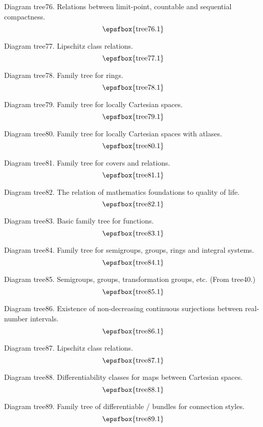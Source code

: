 \filleject

Diagram tree76. Relations between limit-point, countable and sequential
compactness.
$$
\centerline{\epsfbox{tree76.1}}
$$

Diagram tree77. Lipschitz class relations.
$$
\centerline{\epsfbox{tree77.1}}
$$

Diagram tree78. Family tree for rings.
$$
\centerline{\epsfbox{tree78.1}}
$$

\filleject

Diagram tree79. Family tree for locally Cartesian spaces.
$$
\centerline{\epsfbox{tree79.1}}
$$

Diagram tree80. Family tree for locally Cartesian spaces with atlases.
$$
\centerline{\epsfbox{tree80.1}}
$$

Diagram tree81. Family tree for covers and relations.
$$
\centerline{\epsfbox{tree81.1}}
$$

Diagram tree82. The relation of mathematics foundations to quality of life.
$$
\centerline{\epsfbox{tree82.1}}
$$

Diagram tree83. Basic family tree for functions.
$$
\centerline{\epsfbox{tree83.1}}
$$

\filleject

Diagram tree84. Family tree for semigroups, groups, rings and integral systems.
$$
\centerline{\epsfbox{tree84.1}}
$$

Diagram tree85. Semigroups, groups, transformation groups, etc. (From tree40.)
$$
\centerline{\epsfbox{tree85.1}}
$$

Diagram tree86. Existence of non-decreasing continuous surjections between
real-number intervals.
$$
\centerline{\epsfbox{tree86.1}}
$$

Diagram tree87. Lipschitz class relations.
$$
\centerline{\epsfbox{tree87.1}}
$$

\filleject

Diagram tree88. Differentiability classes for maps between Cartesian spaces.
$$
\centerline{\epsfbox{tree88.1}}
$$

Diagram tree89. Family tree of differentiable \fibre/ bundles for connection
styles.
$$
\centerline{\epsfbox{tree89.1}}
$$

\secteject
\edef\SECTvec{\the\pageno}

